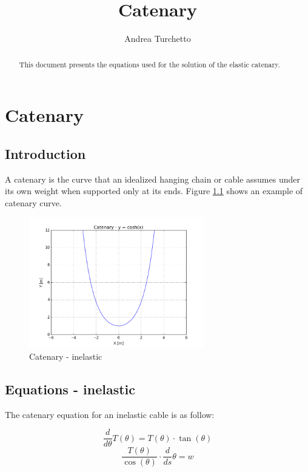 \documentclass{report}
\begin{document}
	\title{Catenary}
	\author{Andrea Turchetto}

	\maketitle
		
	\begin{abstract}
		This document presents the equations used for the solution of the elastic catenary.
	\end{abstract}
	
	\tableofcontents
	\listoffigures
	
	\chapter{Catenary}	
	
	\section{Introduction}
	A catenary is the curve that an idealized hanging chain or cable assumes under its own weight when supported only at its ends.
	Figure \ref{CatenaryFigure} shows an example of catenary curve.
	
	\begin{figure}[h]
		\centering
		\includegraphics[width=3.0in]{Catenary.png}
		\caption{Catenary - inelastic}
		\label{CatenaryFigure}		
	\end{figure}
	
	\section{Equations - inelastic}
	The catenary equation for an inelastic cable is as follow:
	
	\begin{equation}
	\label{eq1.1}
	\frac{d}{d\theta}T(\theta) = T(\theta)\cdot\tan(\theta)
	\end{equation}
	\begin{equation}
	\label{eq1.2}
	\frac{T(\theta)}{\cos(\theta)}\cdot\frac{d}{ds}\theta = w
	\end{equation}
	
\end{document}
